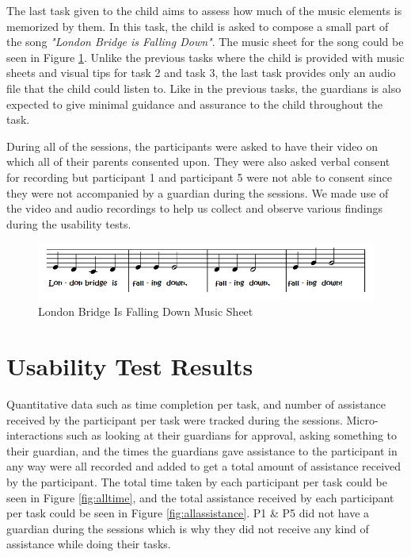 The last task given to the child aims to assess how much of the music elements is memorized by them. In this task, the child is asked to compose a small part of the song \textit{"London Bridge is Falling Down"}. The music sheet for the song could be seen in Figure \ref{fig:LBIFDMusicSheet}. Unlike the previous tasks where the child is provided with music sheets and visual tips for task 2 and task 3, the last task provides only an audio file that the child could listen to. Like in the previous tasks, the guardians is also expected to give minimal guidance and assurance to the child throughout the task. 

During all of the sessions, the participants were asked to have their video on which all of their parents consented upon. They were also asked verbal consent for recording but participant 1 and participant 5 were not able to consent since they were not accompanied by a guardian during the sessions. We made use of the video and audio recordings to help us collect and observe various findings during the usability tests. 

\begin{figure}[H]
    \centering
    \includegraphics[width=15cm]{figures/NewFigures/LondonBridgeMusicSheet.png}
    \caption{London Bridge Is Falling Down Music Sheet}
    \label{fig:LBIFDMusicSheet}
\end{figure}


\section{Usability Test Results}
Quantitative data such as time completion per task, and number of assistance received by the participant per task were tracked during the sessions. Micro-interactions such as looking at their guardians for approval, asking something to their guardian, and the times the guardians gave assistance to the participant in any way were all recorded and added to get a total amount of assistance received by the participant. The total time taken by each participant per task could be seen in Figure \ref{fig:alltime}, and the total assistance received by each participant per task could be seen in Figure \ref{fig:allassistance}. P1 & P5 did not have a guardian during the sessions which is why they did not receive any kind of assistance while doing their tasks.

